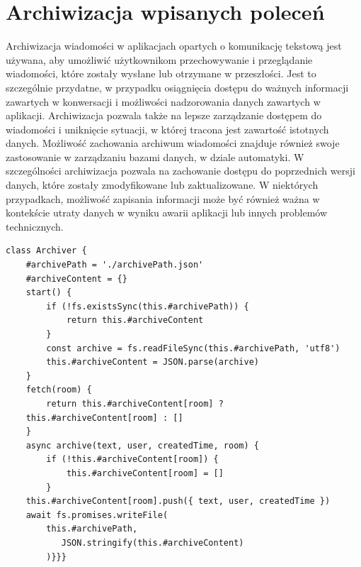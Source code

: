 \section{Archiwizacja wpisanych poleceń}
Archiwizacja wiadomości w aplikacjach opartych o komunikację tekstową jest używana, aby umożliwić użytkownikom przechowywanie i przeglądanie wiadomości, które zostały wysłane lub otrzymane w przeszłości. Jest to szczególnie przydatne, w przypadku osiągnięcia dostępu do ważnych informacji zawartych w konwersacji i możliwości nadzorowania danych zawartych w aplikacji. Archiwizacja pozwala także na lepsze zarządzanie dostępem do wiadomości i uniknięcie sytuacji, w której tracona jest zawartość istotnych danych. Możliwość zachowania archiwum wiadomości znajduje również swoje zastosowanie w zarządzaniu bazami danych, w dziale automatyki. W szczególności archiwizacja pozwala na zachowanie dostępu do poprzednich wersji danych, które zostały zmodyfikowane lub zaktualizowane. W niektórych przypadkach, możliwość zapisania informacji może być również ważna w kontekście utraty danych w wyniku awarii aplikacji lub innych problemów technicznych.
\newpage
\begin{lstlisting}[caption=Implementacja funkcji archiwizującej wiadomości w komunikatorze]
class Archiver {
    #archivePath = './archivePath.json'
    #archiveContent = {}
    start() {
        if (!fs.existsSync(this.#archivePath)) {
            return this.#archiveContent
        }
        const archive = fs.readFileSync(this.#archivePath, 'utf8')
        this.#archiveContent = JSON.parse(archive)
    }
    fetch(room) {
        return this.#archiveContent[room] ? 
	this.#archiveContent[room] : []
    }
    async archive(text, user, createdTime, room) {
        if (!this.#archiveContent[room]) {
            this.#archiveContent[room] = []
        }
    this.#archiveContent[room].push({ text, user, createdTime })
    await fs.promises.writeFile(
    	this.#archivePath,
           JSON.stringify(this.#archiveContent)
        )}}}
\end{lstlisting}

